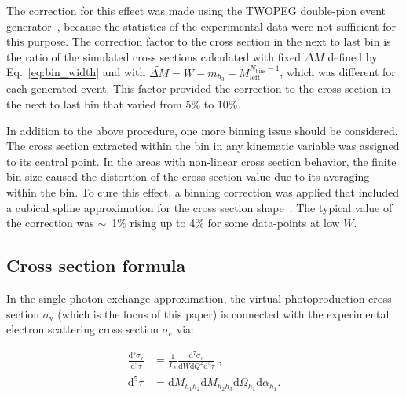 \documentclass[prc,twocolumn,superscriptaddress,showpacs,amssymb,amsmath,amsfonts,aps,nofootinbib]{revtex4-1}
\begin{document}
The correction for this effect was made using the TWOPEG double-pion event generator~\cite{Skorodum:EG}, because the statistics of the experimental data were not sufficient for this purpose. 
The correction factor to the cross section in the next to last bin is the ratio of the simulated cross sections calculated with fixed $\Delta M$ defined by Eq.~\eqref{eq:bin_width} and with $\widetilde{\Delta M} = W - m_{h_{3}} - M_{\text{left}}^{N_{\text{bins}}-1}$, which was different for each generated event. This factor provided the correction to the cross section in the next to last bin that varied from 5\% to 10\%.



In addition to the above procedure, one more binning issue should be considered.
The cross section extracted within the bin in any kinematic variable was assigned to its central point. In the areas with non-linear cross section behavior, the finite bin size caused the distortion of the cross section value due to its averaging within the bin. To cure this effect, a binning correction was applied that included a cubical spline approximation for the cross section shape~\cite{Fed_an_note:2017}. The typical value of the correction was $\sim$~1\% rising up to 4\% for some data-points at low $W$. 























\subsection{Cross section formula}
\label{cr_sect_formula}


In the single-photon exchange approximation, the virtual photoproduction cross section $\sigma_{\text{v}}$ (which is the focus of this paper) is connected with the experimental electron scattering cross section $\sigma_{e}$ via: 

\begin{equation}
\begin{aligned}
\frac{\textrm{d}^{5}\sigma_{\text{v}}}{\textrm{d}^{5}\tau} & = \frac{1}{\Gamma_{\text{v}}}
\frac{\textrm{d}^{7}\sigma_{e}}{\textrm{d}W\textrm{d}Q^{2}\textrm{d}^{5}\tau} \textrm{ ,} \\
\textrm{d}^{5}\tau & = \textrm{d}M_{h_{1}h_{2}}\textrm{d}M_{h_{2}h_{3}}\textrm{d}\Omega_{h_{1}}
\textrm{d}\alpha_{h_{1}} \textrm{.}
\label{fulldiff}
\end {aligned}
\end{equation}
\end{document}
